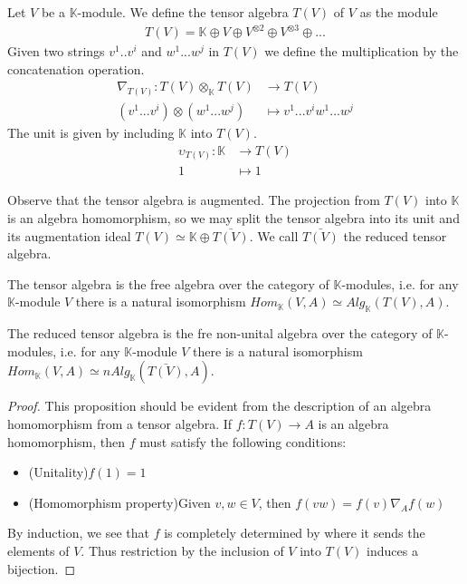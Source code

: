 \documentclass[../thesis.tex]{subfiles}
\begin{document}
            \begin{definition}
                Let $V$ be a $\mathbb{K}$-module. We define the tensor algebra $T(V)$ of $V$ as the module
                \begin{align*}
                    T(V) = \mathbb{K}\oplus V\oplus V^{\otimes 2} \oplus V^{\otimes 3} \oplus ...
                \end{align*}
                Given two strings $v^1..v^i$ and $w^1...w^j$ in $T(V)$ we define the multiplication by the concatenation operation.
                \begin{align*}
                    \nabla_{T(V)} : T(V)\otimes_{\mathbb{K}} T(V) & \rightarrow T(V) \\
                    (v^1...v^i)\otimes(w^1...w^j) & \mapsto v^1...v^iw^1...w^j
                \end{align*}
                The unit is given by including $\mathbb{K}$ into $T(V)$.
                \begin{align*}
                    \upsilon_{T(V)} : \mathbb{K} & \rightarrow T(V) \\
                    1 & \mapsto 1
                \end{align*}
            \end{definition}

            Observe that the tensor algebra is augmented. The projection from $T(V)$ into $\mathbb{K}$ is an algebra homomorphism, so we may split the tensor algebra into its unit and its augmentation ideal $T(V) \simeq \mathbb{K}\oplus\bar{T(V)}$. We call $\bar{T(V)}$ the reduced tensor algebra.

            \begin{proposition}
                The tensor algebra is the free algebra over the category of $\mathbb{K}$-modules, i.e. for any $\mathbb{K}$-module $V$ there is a natural isomorphism $Hom_{\mathbb{K}}(V,A)\simeq Alg_{\mathbb{K}}(T(V),A)$.

                The reduced tensor algebra is the fre non-unital algebra over the category of $\mathbb{K}$-modules, i.e. for any $\mathbb{K}$-module $V$ there is a natural isomorphism $Hom_{\mathbb{K}}(V,A)\simeq nAlg_{\mathbb{K}}(\bar{T(V)},A)$.
            \end{proposition}

            \begin{proof}
                This proposition should be evident from the description of an algebra homomorphism from a tensor algebra. If $f: T(V) \rightarrow A$ is an algebra homomorphism, then $f$ must satisfy the following conditions:
                \begin{itemize}
                    \item (Unitality)\quad $f(1) = 1$
                    \item (Homomorphism property)\quad Given $v,w\in V$, then $f(vw) = f(v)\nabla_Af(w)$
                \end{itemize}
                By induction, we see that $f$ is completely determined by where it sends the elements of $V$. Thus restriction by the inclusion of $V$ into $T(V)$ induces a bijection.
            \end{proof}
\end{document}
